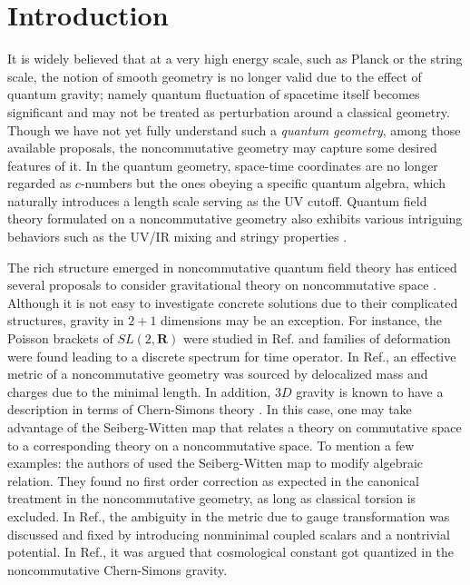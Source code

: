\documentclass[11pt]{article}
\newcommand{\bR}{{\bm{R}}}
\numberwithin{equation}{section}
\begin{document}
\section{Introduction}
\label{sec:introduction}

It is widely believed that at a very high energy scale, such as Planck or the string scale,
the notion of smooth geometry is no longer valid due to the effect of quantum gravity; namely quantum fluctuation of spacetime itself becomes significant and may not be treated as perturbation around a classical geometry.
Though we have not yet fully understand such a {\sl quantum geometry}, 
among those available proposals, the noncommutative geometry \cite{NC_geom} may capture some desired features of
it. In the quantum geometry, space-time coordinates are no longer regarded as $c$-numbers but
the ones obeying a specific quantum algebra, which naturally introduces a length scale serving as the UV cutoff.
Quantum field theory formulated on a noncommutative geometry also
exhibits various intriguing behaviors such as the UV/IR mixing
\cite{Minwalla:1999px} and stringy properties \cite{Yoneya:2000bt}.

The rich structure emerged in noncommutative quantum field theory has enticed several proposals to consider gravitational theory on
noncommutative space \cite{NC_gravity}.  Although it is not easy to
investigate concrete solutions due to their complicated structures, gravity in $2+1$ dimensions may be an exception.  For instance, the
Poisson brackets of $SL(2,\bR)$ were studied in Ref.\cite{Dolan:2006hv} and
families of deformation were found leading to a discrete spectrum for
time operator.  In Ref.\cite{Spallucci:2009zz}, an effective metric of
a noncommutative geometry was sourced by delocalized mass and charges due
to the minimal length.  In addition, $3D$ gravity is known
to have a description in terms of Chern-Simons theory \cite{CS_grav}.  
In this case, one may take advantage of the Seiberg-Witten map that relates a theory on
commutative space to a corresponding theory on a noncommutative space.  
To mention a few examples: the authors of \cite{Mukherjee:2006nd, Banerjee:2007th} used the Seiberg-Witten map to modify algebraic relation.  They found no first order correction as expected in the canonical treatment in the
noncommutative geometry, as long as classical torsion is excluded.
In Ref.\cite{Rivelles:2013ica}, the
ambiguity in the metric due to gauge transformation was discussed
and fixed by introducing nonminimal coupled scalars and a nontrivial
potential.  In Ref.\cite{Pinzul:2005ta}, it was argued that cosmological constant got quantized in the noncommutative Chern-Simons gravity.  
\end{document}

